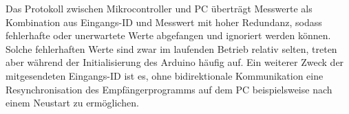 Das Protokoll zwischen Mikrocontroller und PC überträgt Messwerte als Kombination aus
Eingangs-ID und Messwert mit hoher Redundanz, sodass fehlerhafte oder
unerwartete Werte abgefangen und
ignoriert werden können. Solche fehlerhaften Werte sind zwar im laufenden Betrieb relativ selten,
treten aber während der Initialisierung des Arduino häufig auf. Ein weiterer Zweck der
mitgesendeten Eingangs-ID ist es, ohne bidirektionale Kommunikation eine Resynchronisation des
Empfängerprogramms auf dem PC beispielsweise nach einem Neustart zu ermöglichen.